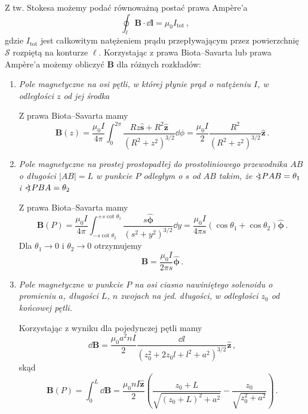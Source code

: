 \documentclass[../main.tex]{subfiles}
\begin{document}
\noindent Z tw. Stokesa możemy podać równoważną postać prawa Ampère'a
\begin{equation*}
    \oint_\ell\mathbf{B}\cdot\dd{\mathbf{l}}=\mu_0I_\text{tot}\,,
\end{equation*}
gdzie \(I_\text{tot}\) jest całkowitym natężeniem prądu przepływającym przez powierzchnię
\(\mathcal{S}\) rozpiętą na konturze \(\ell\). Korzystając z prawa Biota--Savarta lub prawa Ampère'a
możemy obliczyć \(\mathbf{B}\) dla różnych rozkładów:
\begin{enumerate}
    \item \textit{Pole magnetyczne na osi pętli, w której płynie prąd o natężeniu \(I\), w
    odległości \(z\) od jej środka}
    \medskip
    
    Z prawa Biota--Savarta mamy
    \begin{equation*}
        \mathbf{B}(z)=\frac{\mu_0I}{4\pi}\int_0^{2\pi}\frac{Rz\mathbf{\hat{s}}+R^2\mathbf{\hat{z}}}{(R^2+z^2)^{3/2}}\dd{\phi}=\frac{\mu_0I}{2}\frac{R^2}{(R^2+z^2)^{3/2}}\mathbf{\hat{z}}\,.
    \end{equation*}
    
    \item \textit{Pole magnetyczne na prostej prostopadłej do prostoliniowego przewodnika \(AB\) o
    długości \(|AB|=L\) w punkcie \(P\) odległym o \(s\) od \(AB\) takim, że \(\mathord{<\mspace{-9mu}\mathrel{)}\mspace{2mu}}
    PAB=\theta_1\) i \(\mathord{<\mspace{-9mu}\mathrel{)}\mspace{2mu}} PBA=\theta_2\)}
    \medskip
    
    Z prawa Biota--Savarta mamy
    \begin{equation*}
        \mathbf{B}(P)=\frac{\mu_0I}{4\pi}\int_{-s\cot\theta_2}^{+s\cot\theta_1}\frac{s\boldsymbol{\hat{\phi}}}{(s^2+y^2)^{3/2}}\dd{y}=\frac{\mu_0I}{4\pi s}(\cos\theta_1+\cos\theta_2)\boldsymbol{\hat{\phi}}\,.
    \end{equation*}
    Dla \(\theta_1\to0\) i \(\theta_2\to0\) otrzymujemy
    \begin{equation*}
        \mathbf{B}=\frac{\mu_0I}{2\pi s}\boldsymbol{\hat{\phi}}\,.
    \end{equation*}
    
    \item \textit{Pole magnetyczne w punkcie \(P\) na osi ciasno nawiniętego solenoidu o promieniu
    \(a\), długości \(L\), \(n\) zwojach na jed. długości, w odległości \(z_0\) od końcowej pętli.}
    \medskip
    
    Korzystając z wyniku dla pojedynczej pętli mamy
    \begin{equation*}
        \dd{\mathbf{B}}=\frac{\mu_0a^2nI}{2}\frac{\dd{l}}{(z_0^2+2z_0l+l^2+a^2)^{3/2}}\mathbf{\hat{z}}\,,
    \end{equation*}
    skąd
    \begin{equation*}
        \mathbf{B}(P)=\int_0^L\dd{\mathbf{B}}=\frac{\mu_0nI\mathbf{\hat{z}}}{2}\left(\frac{z_0+L}{\sqrt{(z_0+L)^2+a^2}}-\frac{z_0}{\sqrt{z_0^2+a^2}}\right)\,.
    \end{equation*}
    

\end{enumerate}
\end{document}
